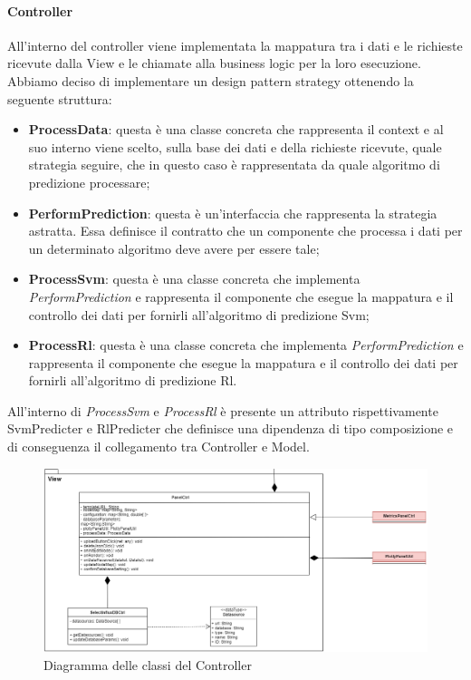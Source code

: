 			\paragraph{Controller}
			All'interno del controller viene implementata la mappatura tra i dati e le richieste ricevute dalla View e le chiamate alla business logic per la loro esecuzione. Abbiamo deciso di implementare un design pattern strategy ottenendo la seguente struttura:
			\begin{itemize}
				\item \textbf{ProcessData}: questa è una classe concreta che rappresenta il context e al suo interno viene scelto, sulla base dei dati e della richieste ricevute, quale strategia seguire, che in questo caso è rappresentata da quale algoritmo di predizione processare;
				\item \textbf{PerformPrediction}: questa è un'interfaccia che rappresenta la strategia astratta. Essa definisce il contratto che un componente che processa i dati per un determinato algoritmo deve avere per essere tale;
				\item \textbf{ProcessSvm}: questa è una classe concreta che implementa \textit{PerformPrediction} e rappresenta il componente che esegue la mappatura e il controllo dei dati per fornirli all'algoritmo di predizione Svm;
				\item \textbf{ProcessRl}: questa è una classe concreta che implementa \textit{PerformPrediction} e rappresenta il componente che esegue la mappatura e il controllo dei dati per fornirli all'algoritmo di predizione Rl.
			\end{itemize}
			All'interno di \textit{ProcessSvm} e \textit{ProcessRl} è presente un attributo rispettivamente SvmPredicter e RlPredicter che definisce una dipendenza di tipo composizione e di conseguenza il collegamento tra Controller e Model.
			\mbox{}
			\begin{figure} [H]
				\includegraphics[width=\linewidth]{./img/Diagrammi/d2.png}
				\caption{Diagramma delle classi del Controller}
			\end{figure}

